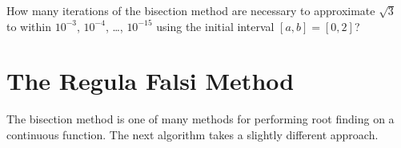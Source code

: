 \begin{problem}
    How many iterations of the bisection method are necessary to approximate $\sqrt{3}$ to
    within $10^{-3}$, $10^{-4}$, \dots, $10^{-15}$ using the initial interval
    $[a,b]=[0,2]$?
\end{problem}



\section{The Regula Falsi Method}
The bisection method is one of many methods for performing root finding on a continuous
function.  The next algorithm takes a slightly different approach.

